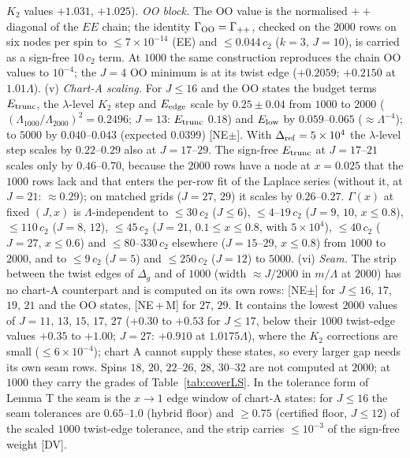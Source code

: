\documentclass[aps,prl,onecolumn,superscriptaddress,nofootinbib]{revtex4-2}
\begin{document}
$K_2$ values $+1.031$, $+1.025$).
\emph{OO block.} The OO value is the normalised $++$ diagonal of the $EE$ chain; the identity $\Gamma_{\rm OO}=\Gamma_{++}$, checked on
the $2000$ rows on six nodes per spin to $\le7\times10^{-14}$ (EE) and $\le0.044\,c_2$ ($k=3$, $J=10$), is carried as a sign-free
$10\,c_2$ term. At $1000$ the same construction reproduces the chain OO values to $10^{-4}$; the $J=4$ OO minimum is at its twist edge ($+0.2059$; $+0.2150$ at $1.01\Lambda$).
(v) \emph{Chart-A scaling.} For $J\le16$ and the OO states the budget terms $E_{\rm trunc}$, the $\lambda$-level $K_2$ step and
$E_{\rm edge}$ scale by $0.25\pm0.04$ from $1000$ to $2000$ ($(\Lambda_{1000}/\Lambda_{2000})^2=0.2496$; $J=13$: $E_{\rm trunc}$
$0.18$) and $E_{\rm low}$ by $0.059$--$0.065$ ($\approx\Lambda^{-4}$); to $5000$ by $0.040$--$0.043$ (expected $0.0399$) [NE$\pm$].
With $\Delta_{\rm ref}=5\times10^4$ the $\lambda$-level step scales by $0.22$--$0.29$ also at $J=17$--$29$. The sign-free
$E_{\rm trunc}$ at $J=17$--$21$ scales only by $0.46$--$0.70$, because the $2000$ rows have a node at $x=0.025$ that the $1000$ rows lack
and that enters the per-row fit of the Laplace series (without it, at $J=21$: $\approx0.29$); on matched grids ($J=27$, $29$) it
scales by $0.26$--$0.27$. $\Gamma(x)$ at fixed $(J,x)$ is $\Lambda$-independent to $\le30\,c_2$ ($J\le6$), $\le4$--$19\,c_2$ ($J=9$, $10$,
$x\le0.8$), $\le110\,c_2$ ($J=8$, $12$), $\le45\,c_2$ ($J=21$, $0.1\le x\le0.8$, with $5\times10^4$), $\le40\,c_2$ ($J=27$, $x\le0.6$) and
$\le80$--$330\,c_2$ elsewhere ($J=15$--$29$, $x\le0.8$) from $1000$ to $2000$, and to $\le9\,c_2$ ($J=5$) and $\le250\,c_2$ ($J=12$) to $5000$.
(vi) \emph{Seam.} The strip between the twist edges of $\Delta_g$ and of $1000$ (width $\approx J/2000$ in $m/\Lambda$ at $2000$) has no
chart-A counterpart and is computed on its own rows: [NE$\pm$] for $J\le16$, $17$, $19$, $21$ and the OO states, [NE\,+\,M] for $27$,
$29$. It contains the lowest $2000$ values of $J=11$, $13$, $15$, $17$, $27$ ($+0.30$ to $+0.53$ for $J\le17$, below their $1000$ twist-edge
values $+0.35$ to $+1.00$; $J=27$: $+0.910$ at $1.0175\Lambda$), where the $K_2$ corrections are small ($\le6\times10^{-4}$); chart A
cannot supply these states, so every larger gap needs its own seam rows. Spins $18$, $20$, $22$--$26$, $28$, $30$--$32$ are not computed at $2000$; at $1000$ they carry the grades of Table~\ref{tab:coverLS}.
In the tolerance form of Lemma T the seam is the $x\to1$ edge window of chart-A states: for $J\le16$ the seam tolerances are
$0.65$--$1.0$ (hybrid floor) and $\ge0.75$ (certified floor, $J\le12$) of the scaled $1000$ twist-edge tolerance, and the strip
carries $\le10^{-3}$ of the sign-free weight [DV].
\end{document}

